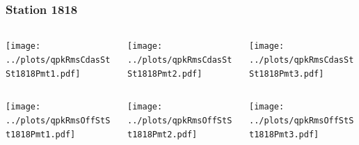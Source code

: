 \documentclass[aspectratio=169]{beamer}
\begin{document}
\begin{frame} 
  \frametitle{Station 1818}
  \begin{center}
    \begin{columns}
      \begin{column}{0.33\textwidth}
        \texttt{[image: ../plots/qpkRmsCdasStSt1818Pmt1.pdf]}
      \end{column}
      \begin{column}{0.33\textwidth}
        \texttt{[image: ../plots/qpkRmsCdasStSt1818Pmt2.pdf]}
      \end{column}
      \begin{column}{0.33\textwidth}
        \texttt{[image: ../plots/qpkRmsCdasStSt1818Pmt3.pdf]}
      \end{column}
    \end{columns}
  \end{center}

  \begin{center}
    \begin{columns}
      \begin{column}{0.33\textwidth}
        \texttt{[image: ../plots/qpkRmsOffStSt1818Pmt1.pdf]}
      \end{column}
      \begin{column}{0.33\textwidth}
        \texttt{[image: ../plots/qpkRmsOffStSt1818Pmt2.pdf]}
      \end{column}
      \begin{column}{0.33\textwidth}
        \texttt{[image: ../plots/qpkRmsOffStSt1818Pmt3.pdf]}
      \end{column}
    \end{columns}
  \end{center}
\end{frame}
\end{document}
